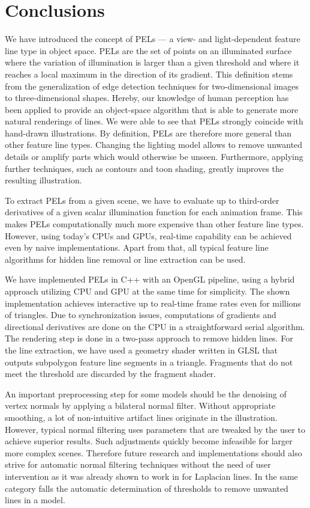 \documentclass[9pt,fleqn,twoside,twocolumn]{stdglobal}
\begin{document}
\section{Conclusions}
  We have introduced the concept of PELs --- a view- and light-dependent feature line type in object space.
  PELs are the set of points on an illuminated surface where the variation of illumination is larger than a given threshold and where it reaches a local maximum in the direction of its gradient.
  This definition stems from the generalization of edge detection techniques for two-dimensional images to three-dimensional shapes.
  Hereby, our knowledge of human perception has been applied to provide an object-space algorithm that is able to generate more natural renderings of lines.
  We were able to see that PELs strongly coincide with hand-drawn illustrations.
  By definition, PELs are therefore more general than other feature line types.
  Changing the lighting model allows to remove unwanted details or amplify parts which would otherwise be unseen.
  Furthermore, applying further techniques, such as contours and toon shading, greatly improves the resulting illustration.

  To extract PELs from a given scene, we have to evaluate up to third-order derivatives of a given scalar illumination function for each animation frame.
  This makes PELs computationally much more expensive than other feature line types.
  However, using today's CPUs and GPUs, real-time capability can be achieved even by naive implementations.
  Apart from that, all typical feature line algorithms for hidden line removal or line extraction can be used.

  We have implemented PELs in C++ with an OpenGL pipeline, using a hybrid approach utilizing CPU and GPU at the same time for simplicity.
  The shown implementation achieves interactive up to real-time frame rates even for millions of triangles.
  Due to synchronization issues, computations of gradients and directional derivatives are done on the CPU in a straightforward serial algorithm.
  The rendering step is done in a two-pass approach to remove hidden lines.
  For the line extraction, we have used a geometry shader written in GLSL that outputs subpolygon feature line segments in a triangle.
  Fragments that do not meet the threshold are discarded by the fragment shader.

  An important preprocessing step for some models should be the denoising of vertex normals by applying a bilateral normal filter.
  Without appropriate smoothing, a lot of non-intuitive artifact lines originate in the illustration.
  However, typical normal filtering uses parameters that are tweaked by the user to achieve superior results.
  Such adjustments quickly become infeasible for larger more complex scenes.
  Therefore future research and implementations should also strive for automatic normal filtering techniques without the need of user intervention as it was already shown to work in \textcite{zhang2011} for Laplacian lines.
  In the same category falls the automatic determination of thresholds to remove unwanted lines in a model.
\end{document}
